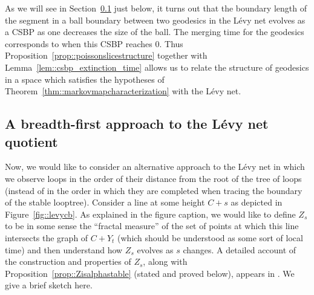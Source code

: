 \documentclass[JEP,XML,SOM,Unicode]{cedram}
\theoremstyle{plain}
\numberwithin{theorem}{section}
\theoremstyle{definition}
\begin{document}
As we will see in Section~\ref{subsec::levynetbreadthfirst} just below, it turns out that the boundary length of the segment in a ball boundary between two geodesics in the Lévy net evolves as a CSBP as one decreases the size of the ball. The merging time for the geodesics corresponds to when this CSBP reaches $0$. Thus Proposition~\ref{prop::poissonslicestructure} together with Lemma~\ref{lem::csbp_extinction_time} allows us to relate the structure of geodesics in a space which satisfies the hypotheses of Theorem~\ref{thm::markovmapcharacterization} with the Lévy net.

\subsection{A breadth-first approach to the Lévy net quotient}
\label{subsec::levynetbreadthfirst}

Now, we would like to consider an alternative approach to the Lévy net in which we observe loops in the order of their distance from the root of the tree of loops (instead of in the order in which they are completed when tracing the boundary of the stable looptree). Consider a line at some height $C+s$ as depicted in Figure~\ref{fig::levycb}. As explained in the figure caption, we would like to define $Z_s$ to be in some sense the ``fractal measure'' of the set of points at which this line intersects the graph of $C+Y_t$ (which should be understood as some sort of local time) and then understand how $Z_s$ evolves as $s$ changes. A detailed account of the construction and properties of $Z_s$, along with Proposition~\ref{prop::Zisalphastable} (stated and proved below), appears in \cite{duquesnelegall2005levytrees}. We give a brief sketch here.
\end{document}
